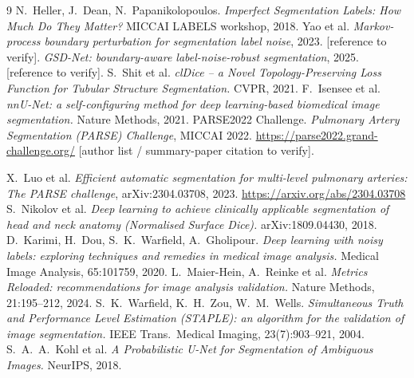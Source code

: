 \documentclass[
    bookmarks, bookmarksnumbered, bookmarksopen,
    colorlinks=true, citecolor=blue, linkcolor=blue, urlcolor=blue
]{techrep}
\begin{document}
\begin{thebibliography}{9}
\small
{} N.~Heller, J.~Dean, N.~Papanikolopoulos.
  \emph{Imperfect Segmentation Labels: How Much Do They Matter?} MICCAI LABELS
  workshop, 2018.
 Yao et al. \emph{Markov-process boundary perturbation for
  segmentation label noise}, 2023. {\small[reference to verify]}.
 \emph{GSD-Net: boundary-aware label-noise-robust segmentation}, 2025.
  {\small[reference to verify]}.
 S.~Shit et al. \emph{clDice -- a Novel Topology-Preserving
  Loss Function for Tubular Structure Segmentation.} CVPR, 2021.
 F.~Isensee et al. \emph{nnU-Net: a self-configuring method
  for deep learning-based biomedical image segmentation.} Nature Methods, 2021.
 PARSE2022 Challenge. \emph{Pulmonary Artery Segmentation (PARSE)
  Challenge}, MICCAI 2022. \url{https://parse2022.grand-challenge.org/}
  {\color{red}\small[author list / summary-paper citation to verify]}.

 X.~Luo et al. \emph{Efficient automatic segmentation for
  multi-level pulmonary arteries: The PARSE challenge}, arXiv:2304.03708, 2023.
  \url{https://arxiv.org/abs/2304.03708}
 S.~Nikolov et al. \emph{Deep learning to achieve clinically
  applicable segmentation of head and neck anatomy (Normalised Surface Dice).}
  arXiv:1809.04430, 2018.
 D.~Karimi, H.~Dou, S.~K.~Warfield, A.~Gholipour. \emph{Deep
  learning with noisy labels: exploring techniques and remedies in medical image analysis.}
  Medical Image Analysis, 65:101759, 2020.
 L.~Maier-Hein, A.~Reinke et al. \emph{Metrics Reloaded:
  recommendations for image analysis validation.} Nature Methods, 21:195--212, 2024.
 S.~K.~Warfield, K.~H.~Zou, W.~M.~Wells. \emph{Simultaneous
  Truth and Performance Level Estimation (STAPLE): an algorithm for the validation of image
  segmentation.} IEEE Trans.\ Medical Imaging, 23(7):903--921, 2004.
 S.~A.~A.~Kohl et al. \emph{A Probabilistic U-Net for
  Segmentation of Ambiguous Images.} NeurIPS, 2018.
\end{thebibliography}
\end{document}
